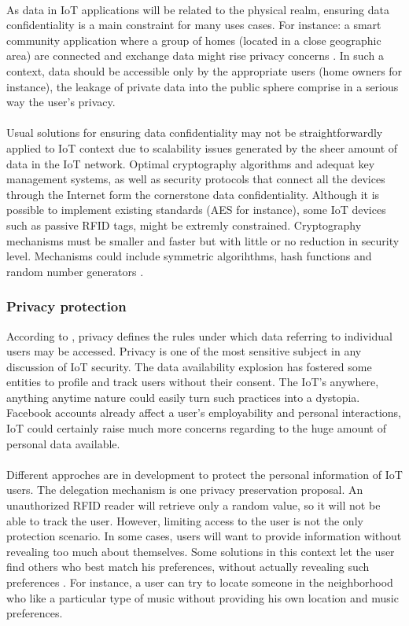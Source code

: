 \documentclass[10pt, twocolumn]{article}
\begin{document}
\paragraph{}
As data in IoT applications will be related to the physical realm, ensuring data confidentiality is a main constraint for many uses cases. For instance: a smart community application where a group of homes (located in a close geographic area) are connected and exchange data might rise privacy concerns \cite{ref12}. In such a context, data should be accessible only by the appropriate users (home owners for instance), the leakage of private data into the public sphere comprise in a serious way the user's privacy.
\paragraph{}
Usual solutions for ensuring data confidentiality may not be straightforwardly applied to IoT context due to scalability issues generated by the sheer amount of data in the IoT network. Optimal cryptography algorithms and adequat key management systems, as well as security protocols that connect all the devices  through the Internet form the cornerstone data confidentiality. Although it is possible to implement existing standards (AES for instance), some IoT devices such as passive RFID tags, might be extremly constrained. Cryptography mechanisms must be smaller and faster but with little or no reduction in security level. Mechanisms could include symmetric algorihthms, hash functions and random number generators \cite{ref11}.
\subsubsection{Privacy protection} 
According to \cite{ref2}, privacy defines the rules under which data referring to individual users may be accessed. Privacy is one of the most sensitive subject in any discussion of IoT security. The data availability explosion has fostered some entities to profile and track users without their consent. The IoT's anywhere, anything anytime nature could easily turn such practices into a dystopia. Facebook accounts already affect a user's employability and personal interactions, IoT could certainly raise much more concerns regarding to the huge amount of personal data available.
\paragraph{}
Different approches are in development to protect the personal information of IoT users. The delegation mechanism is one privacy preservation proposal. An unauthorized RFID reader will retrieve only a random value, so it will not be able to track the user.
However, limiting access to the user is not the only protection scenario. In some cases, users will want to provide information without revealing too much about themselves. Some solutions in this context let the user find others who best match his preferences, without actually revealing such preferences \cite{ref11}. For instance, a user can try to locate someone in the neighborhood who like a particular type of music without providing his own location and music preferences.
\end{document}
